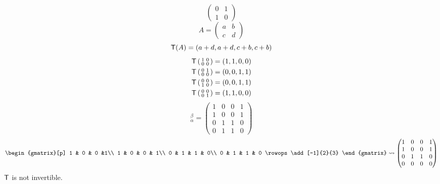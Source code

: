 \begin{enumerate}
\[\begin{pmatrix}
0 & 1\\
1 & 0
\end{pmatrix}
\]
\begin{equation}
A = \begin{pmatrix}
a & b\\
c & d
\end{pmatrix}
\end{equation}
\begin{equation}
\mathsf{T}(A) = (a+d,a+d,c+b, c+b)
\end{equation}
\begin{align}
\mathsf{T}\left(\begin{smallmatrix}
1 & 0\\
0 & 0
\end{smallmatrix}\right) & = (1,1,0,0)\\
\mathsf{T}\left(\begin{smallmatrix}
0 & 1\\
0 & 0
\end{smallmatrix}\right) & = (0,0,1,1)\\
\mathsf{T}\left(\begin{smallmatrix}
0 & 0\\
1 & 0
\end{smallmatrix}\right) & = (0,0,1,1)\\
\mathsf{T}\left(\begin{smallmatrix}
0 & 0\\
0 & 1
\end{smallmatrix}\right) & = (1,1,0,0)
\end{align}
\begin{equation}
[\T]_\alpha^\beta = \begin{pmatrix}
1 & 0 & 0 &1\\
1 & 0 & 0 & 1\\
0 & 1 & 1 & 0\\
0 & 1 & 1 & 0
\end{pmatrix}
\end{equation}
\begin{equation}
\begin{gmatrix}[p]
1 & 0 & 0 &1\\
1 & 0 & 0 & 1\\
0 & 1 & 1 & 0\\
0 & 1 & 1 & 0
\rowops
\add[-1]{2}{3}
\end{gmatrix}
\leadsto
\begin{pmatrix}
1 & 0 & 0 &1\\
1 & 0 & 0 & 1\\
0 & 1 & 1 & 0\\
0 & 0 & 0 & 0
\end{pmatrix}
\end{equation}
$\mathsf{T}$ is not invertible.
\end{enumerate}
